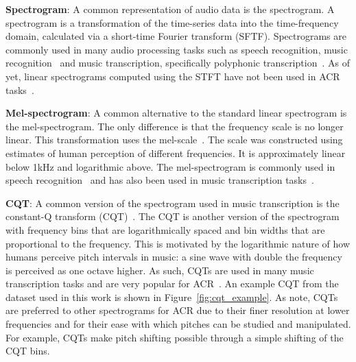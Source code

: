 \textbf{Spectrogram}: A common representation of audio data is the spectrogram. A spectrogram is a transformation of the time-series data into the time-frequency domain, calculated via a short-time Fourier transform (SFTF). Spectrograms are commonly used in many audio processing tasks such as speech recognition, music recognition~\citep{ShazamSpectrogram} and music transcription, specifically polyphonic transcription~\citep{PianoTranscriptionWithTransformer}. As of yet, linear spectrograms computed using the STFT have not been used in ACR tasks~\citep{20YearsofACR}.

\textbf{Mel-spectrogram}: A common alternative to the standard linear spectrogram is the mel-spectrogram. The only difference is that the frequency scale is no longer linear. This transformation uses the mel-scale~\citep{MelScale}. The scale was constructed using estimates of human perception of different frequencies. It is approximately linear below 1kHz and logarithmic above. The mel-spectrogram is commonly used in speech recognition~\citep{SpeechProcessingMels} and has also been used in music transcription tasks~\citep{MelodyTranscriptionViaGenerativePreTraining}.

\textbf{CQT}: A common version of the spectrogram used in music transcription is the constant-Q transform (CQT)~\citep{CQT}. The CQT is another version of the spectrogram with frequency bins that are logarithmically spaced and bin widths that are proportional to the frequency. This is motivated by the logarithmic nature of how humans perceive pitch intervals in music: a sine wave with double the frequency is perceived as one octave higher. As such, CQTs are used in many music transcription tasks and are very popular for ACR~\citep{FirstDeepLearningCQT,StructuredTraining}. An example CQT from the dataset used in this work is shown in Figure~\ref{fig:cqt_example}. As \citet{SaliencyChroma} note, CQTs are preferred to other spectrograms for ACR due to their finer resolution at lower frequencies and for their ease with which pitches can be studied and manipulated. For example, CQTs make pitch shifting possible through a simple shifting of the CQT bins. 

